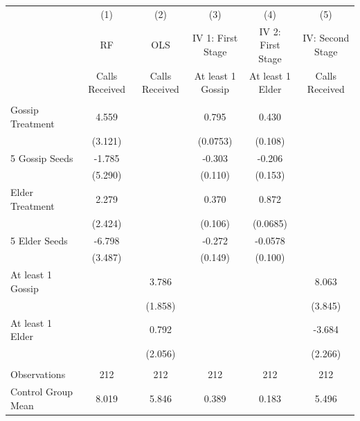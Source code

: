 \begin{tabular}{lccccc} \hline
 & (1) & (2) & (3) & (4) & (5) \\
 & RF & OLS & IV 1: First Stage & IV 2: First Stage & IV: Second Stage \\
 & Calls Received & Calls Received & At least 1 Gossip & At least 1 Elder & Calls Received \\ \hline
 &  &  &  &  &  \\
Gossip Treatment & 4.559 &  & 0.795 & 0.430 &  \\
 & (3.121) &  & (0.0753) & (0.108) &  \\
5 Gossip Seeds & -1.785 &  & -0.303 & -0.206 &  \\
 & (5.290) &  & (0.110) & (0.153) &  \\
Elder Treatment & 2.279 &  & 0.370 & 0.872 &  \\
 & (2.424) &  & (0.106) & (0.0685) &  \\
5 Elder Seeds & -6.798 &  & -0.272 & -0.0578 &  \\
 & (3.487) &  & (0.149) & (0.100) &  \\
At least 1 Gossip &  & 3.786 &  &  & 8.063 \\
 &  & (1.858) &  &  & (3.845) \\
At least 1 Elder &  & 0.792 &  &  & -3.684 \\
 &  & (2.056) &  &  & (2.266) \\
 &  &  &  &  &  \\
Observations & 212 & 212 & 212 & 212 & 212 \\
 Control Group Mean & 8.019 & 5.846 & 0.389 & 0.183 & 5.496 \\ \hline
\end{tabular}
